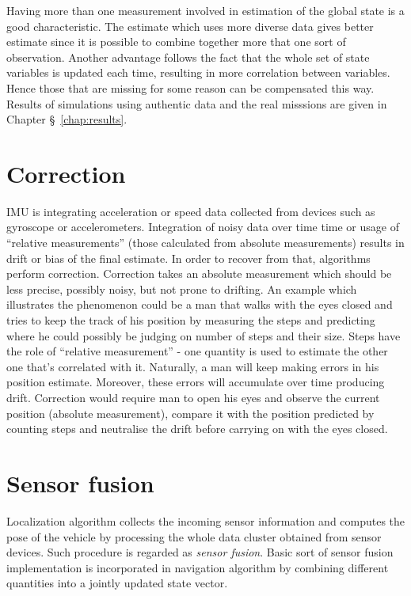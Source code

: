 Having more than one measurement involved in estimation of the global state is a good characteristic. The estimate which uses more diverse data gives better estimate since it is possible to combine together more that one sort of observation. Another advantage follows the fact that the whole set of state variables is updated each time, resulting in more correlation between variables. Hence those that are missing for some reason can be compensated this way. Results of simulations using authentic data and the  real misssions are given in Chapter \S~\ref{chap:results}. 
\section{Correction}
IMU is integrating acceleration or speed data collected from devices such as gyroscope or accelerometers. Integration of noisy data over time time or usage of ``relative measurements'' (those calculated from absolute measurements) results in drift or bias of the final estimate. In order to recover from that, algorithms perform correction. Correction takes an absolute measurement which should be less precise, possibly noisy, but not prone to drifting. An example which illustrates the phenomenon could be a man that walks with the eyes closed and tries to keep the track of his position by measuring the steps and predicting where he could possibly be judging on number of steps and their size. Steps have the role of ``relative measurement'' - one quantity is used to estimate the other one that's correlated with it. Naturally, a man will keep making errors in his position estimate. Moreover, these errors will accumulate over time producing drift. Correction would require man to open his eyes and observe the current position (absolute measurement), compare it with the position predicted by counting steps and neutralise the drift before carrying on with the eyes closed. 
\section{Sensor fusion}
Localization algorithm collects the incoming sensor information and computes the pose of the vehicle by processing the whole data cluster obtained from sensor devices. Such procedure is regarded as \textit{sensor fusion}. Basic sort of sensor fusion implementation is incorporated in navigation algorithm by combining different quantities into a jointly updated state vector.

